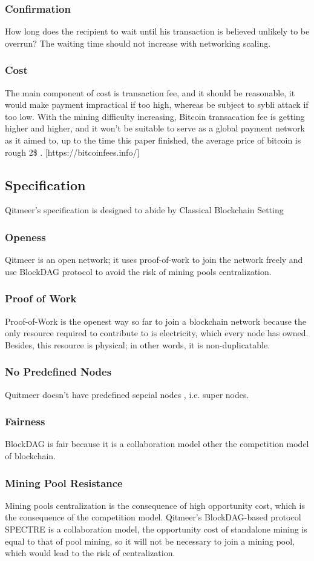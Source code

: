 \documentclass[a4paper,11pt]{article}
\begin{document}
\subsubsection*{Confirmation}
How long does the recipient to wait until his transaction is believed unlikely to be overrun? The waiting time should not increase with networking scaling.
\subsubsection*{Cost}
The main component of cost is transaction fee, and it should be reasonable, it would make payment impractical if too high, whereas be subject to sybli attack if too low. With the mining difficulty increasing, Bitcoin transacation fee is getting higher and higher, and it won't be suitable to serve as a global payment network as it aimed to, up to the time this paper finished, the average price of bitcoin is rough 2\$ . [https://bitcoinfees.info/]

\subsection{Specification}
Qitmeer's specification is designed to abide by Classical Blockchain Setting
\subsubsection{Openess}
Qitmeer is an open network; it uses proof-of-work to join the network freely and use BlockDAG protocol to avoid the risk of mining pools centralization.
\subsubsection*{Proof of Work}
Proof-of-Work is the openest way so far to join a blockchain network because the only resource required to contribute to is electricity, which every node has owned. Besides, this resource is physical; in other words, it is non-duplicatable. 
\subsubsection*{No Predefined Nodes}
 Quitmeer doesn't have predefined sepcial nodes , i.e. super nodes.
\subsubsection{Fairness}
BlockDAG is fair because it is a collaboration model other the competition model of blockchain.
\subsubsection*{Mining Pool Resistance}
Mining pools centralization is the consequence of high opportunity cost, which is the consequence of the competition model. Qitmeer's BlockDAG-based protocol SPECTRE is a collaboration model, the opportunity cost of standalone mining is equal to that of pool mining, so it will not be necessary to join a mining pool, which would lead to the risk of centralization.
\end{document}
